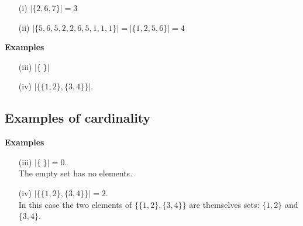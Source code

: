 \begin{itemize}
\item[(i)] $|\{2,6,7\}| = 3$
\vspace{2cm}
\item[(ii)] $|\{5,6,5,2,2,6,5,1,1,1\}| = |\{1,2,5,6\}| = 4$
\end{itemize}


\textbf{Examples}
\begin{itemize}
\item[(iii)] $|\{ \; \}| $
\vspace{2cm}
\item[(iv)] $|\{\{1,2\},\{3,4\}\}| $.
\end{itemize}



\subsection{Examples of cardinality}

\textbf{Examples}
\begin{itemize}
\item[(iii)] $|\{ \; \}| = 0$. \\ The empty set has no elements.
\vspace{0.4cm} 
\item[(iv)] $|\{\{1,2\},\{3,4\}\}| = 2$. \\ \vspace{0.4cm} In this case the two elements of $\{\{1,2\},\{3,4\}\}$ are themselves sets: $\{1,2\}$ and $\{3,4\}$.
\end{itemize}


